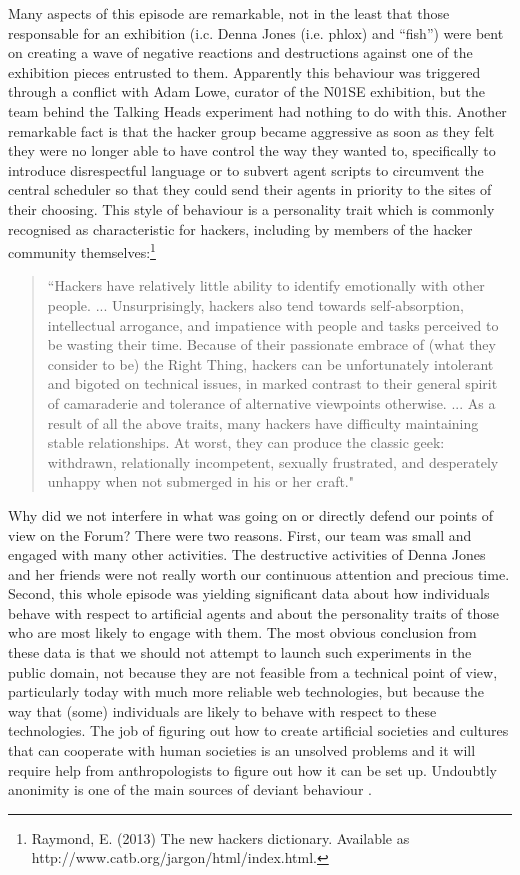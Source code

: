 Many aspects of this episode are remarkable, not in the least that those responsable for an 
exhibition (i.c. Denna Jones (i.e. phlox) and ``fish'') were bent on creating a wave of negative reactions and 
destructions against one of the exhibition pieces entrusted to them. Apparently this behaviour was triggered through
a conflict 
with Adam Lowe, curator of the N01SE exhibition, but the team behind the Talking Heads experiment had nothing to do 
with this. Another remarkable fact is that the hacker group 
became aggressive as soon as they felt they were no longer able to have control the way they wanted to, specifically 
to introduce disrespectful language or to subvert agent scripts to circumvent the central scheduler so that they 
could send their agents in priority to the sites of their choosing.
This style of behaviour is a personality trait which is commonly recognised as characteristic for 
hackers, including by members of the hacker community themselves:\footnote{
Raymond, E. (2013) The new hackers dictionary. Available as http://www.catb.org/jargon/html/index.html.}

\begin{quotation}
``Hackers have relatively little ability to identify emotionally with other people. ... Unsurprisingly, hackers also tend towards self-absorption, intellectual arrogance, and impatience with people and tasks perceived to be wasting their time. Because of their passionate embrace of (what they consider to be) the Right Thing, hackers can be unfortunately intolerant and bigoted on technical issues, in marked contrast to their general spirit of camaraderie and tolerance of alternative viewpoints otherwise. ... As a result of all the above traits, many hackers have difficulty maintaining stable relationships. At worst, they can produce the classic geek: withdrawn, relationally incompetent, sexually frustrated, and desperately unhappy when not submerged in his or her craft."
\end{quotation}

Why did we not interfere in what was going on or directly defend our points of view on the Forum? There were two reasons. First, our team was small and engaged with many other activities. The destructive activities of Denna Jones and her friends were not really worth our continuous attention and precious time. Second, this whole episode was yielding significant data about how individuals behave with respect to artificial agents and about the personality traits of those who are most likely to engage with them. The most obvious conclusion from these data is that we should not attempt to launch such experiments in 
the public domain, not because they are not feasible from a technical point of view, particularly today with much more 
reliable web technologies, but because the way that (some) individuals are likely 
to behave with respect to these technologies. The job of figuring out how to create artificial societies and cultures 
that can cooperate with human societies is an unsolved problems and it will require help from anthropologists to figure out 
how it can be set up. Undoubtly anonimity is one of the main sources of deviant behaviour \citep{Knight:1999}. 

